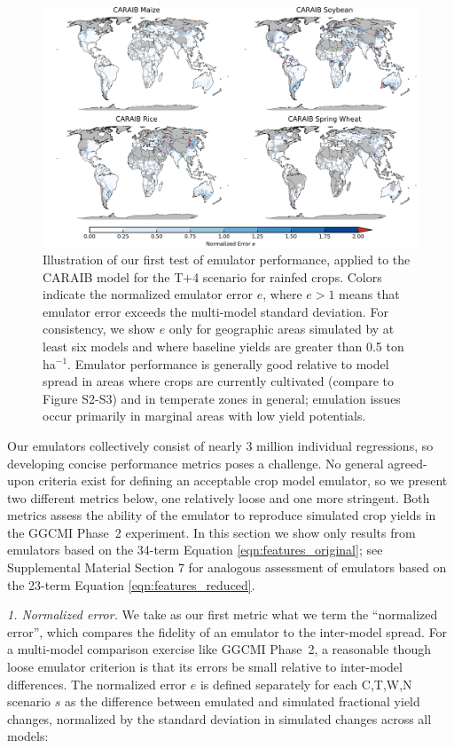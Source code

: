 \documentclass[gmdd]{copernicus} %
\begin{document}
    \begin{figure}[h!]
        \centering
            \includegraphics[width=16.3cm]{figures/CARAIB_spatial_error.png}
            \caption{
            Illustration of our first test of emulator performance, applied to the CARAIB model for the T+4 scenario for rainfed crops. 
            Colors indicate the normalized emulator error $e$, where $e > 1$ means that emulator error exceeds the multi-model standard deviation. 
            For consistency, we show $e$ only for geographic areas simulated by at least six models and where baseline yields are greater than 0.5 ton ha$^{-1}$.
            Emulator performance is generally good relative to model spread in areas where crops are currently cultivated (compare to Figure S2-S3) and in temperate zones in general; emulation issues occur primarily in marginal areas with low yield potentials. 
            }
           \label{fig:error}
        \end{figure}

Our emulators collectively consist of nearly 3 million individual regressions, so developing concise performance metrics poses a challenge.
No general agreed-upon criteria exist for defining an acceptable crop model emulator, so we present two different metrics below, one relatively loose and one more stringent.  
Both metrics assess the ability of the emulator to reproduce simulated crop yields in the GGCMI Phase~2 experiment. 
In this section we show only results from emulators based on the 34-term Equation \ref{eqn:features_original};
see Supplemental Material Section 7 for analogous assessment of emulators based on the 23-term Equation \ref{eqn:features_reduced}.

\smallskip
\textit{1. Normalized error.} 
We take as our first metric what we term the ``normalized error'', which compares the fidelity of an emulator to the inter-model spread. 
For a multi-model comparison exercise like GGCMI Phase~2, a reasonable though loose emulator criterion is that its errors be small relative to inter-model differences. The normalized error $e$ is defined separately for each C,T,W,N scenario $s$ as the difference between emulated and simulated fractional yield changes, normalized by the standard deviation in simulated changes across all models: 
\end{document}
